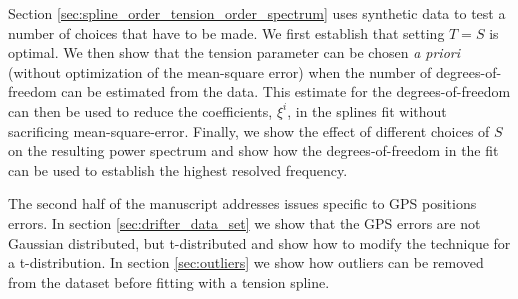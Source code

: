 \documentclass[10pt,journal]{IEEEtran}
\begin{document}
Section \ref{sec:spline_order_tension_order_spectrum} uses synthetic data to test a number of choices that have to be made. We first establish that setting $T=S$ is optimal. We then show that the tension parameter can be chosen \emph{a priori} (without optimization of the mean-square error) when the number of degrees-of-freedom can be estimated from the data. This estimate for the degrees-of-freedom can then be used to reduce the coefficients, $\xi^i$, in the splines fit without sacrificing mean-square-error. Finally, we show the effect of different choices of $S$ on the resulting power spectrum and show how the degrees-of-freedom in the fit can be used to establish the highest resolved frequency.

The second half of the manuscript addresses issues specific to GPS positions errors. In section \ref{sec:drifter_data_set} we show that the GPS errors are not Gaussian distributed, but t-distributed and show how to modify the technique for a t-distribution. In section \ref{sec:outliers} we show how outliers can be removed from the dataset before fitting with a tension spline.





\end{document}
